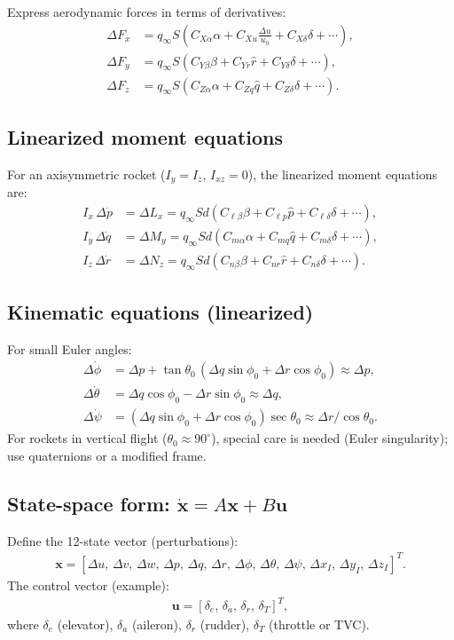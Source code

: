 \documentclass[11pt]{article}
\begin{document}
Express aerodynamic forces in terms of derivatives:
\begin{align}
\Delta F_x &= q_\infty S\left(C_{X\alpha}\alpha + C_{Xu}\frac{\Delta u}{u_0} + C_{X\delta}\delta + \cdots\right),\\
\Delta F_y &= q_\infty S\left(C_{Y\beta}\beta + C_{Yr}\hat r + C_{Y\delta}\delta + \cdots\right),\\
\Delta F_z &= q_\infty S\left(C_{Z\alpha}\alpha + C_{Zq}\hat q + C_{Z\delta}\delta + \cdots\right).
\end{align}

\subsection{Linearized moment equations}
For an axisymmetric rocket ($I_y=I_z$, $I_{xz}=0$), the linearized moment equations are:
\begin{align}
I_x\,\Delta\dot p &= \Delta L_x = q_\infty Sd\left(C_{\ell\beta}\beta + C_{\ell p}\hat p + C_{\ell\delta}\delta + \cdots\right),\\
I_y\,\Delta\dot q &= \Delta M_y = q_\infty Sd\left(C_{m\alpha}\alpha + C_{mq}\hat q + C_{m\delta}\delta + \cdots\right),\\
I_z\,\Delta\dot r &= \Delta N_z = q_\infty Sd\left(C_{n\beta}\beta + C_{nr}\hat r + C_{n\delta}\delta + \cdots\right).
\end{align}

\subsection{Kinematic equations (linearized)}
For small Euler angles:
\begin{align}
\Delta\dot\phi &= \Delta p + \tan\theta_0\,(\Delta q\sin\phi_0 + \Delta r\cos\phi_0) \approx \Delta p,\\
\Delta\dot\theta &= \Delta q\cos\phi_0 - \Delta r\sin\phi_0 \approx \Delta q,\\
\Delta\dot\psi &= (\Delta q\sin\phi_0 + \Delta r\cos\phi_0)\sec\theta_0 \approx \Delta r/\cos\theta_0.
\end{align}
For rockets in vertical flight ($\theta_0\approx 90^\circ$), special care is needed (Euler singularity); use quaternions or a modified frame.

\subsection{State-space form: $\dot{\mathbf{x}}=A\mathbf{x}+B\mathbf{u}$}
Define the 12-state vector (perturbations):
\begin{align}
\mathbf{x} = [\Delta u,\,\Delta v,\,\Delta w,\,\Delta p,\,\Delta q,\,\Delta r,\,\Delta\phi,\,\Delta\theta,\,\Delta\psi,\,\Delta x_I,\,\Delta y_I,\,\Delta z_I]^T.
\end{align}
The control vector (example):
\begin{align}
\mathbf{u} = [\delta_e,\,\delta_a,\,\delta_r,\,\delta_T]^T,
\end{align}
where $\delta_e$ (elevator), $\delta_a$ (aileron), $\delta_r$ (rudder), $\delta_T$ (throttle or TVC).
\end{document}
